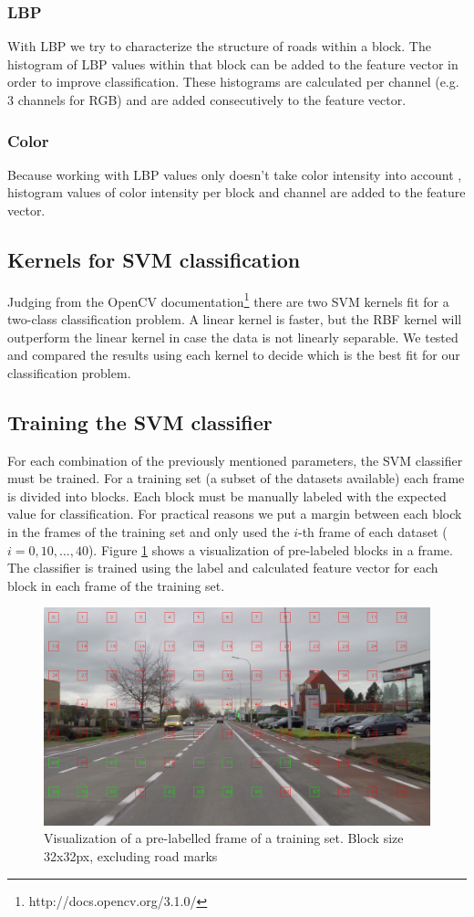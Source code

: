 \documentclass[runningheads,a4paper]{llncs}
\begin{document}
\subsubsection{LBP}
With LBP we try to characterize the structure of roads within a block. The histogram of LBP values within that block can be added to the feature vector in order to improve classification. These histograms are calculated per channel (e.g. 3 channels for RGB) and are added consecutively to the feature vector. 


\subsubsection{Color}
Because working with LBP values only doesn't take color intensity into account \cite{Pietikainen2002}, histogram values of color intensity per block and channel are added to the feature vector. 

\subsection{Kernels for SVM classification}\label{methods-kernels}
Judging from the OpenCV documentation\footnote{http://docs.opencv.org/3.1.0/} there are two SVM kernels fit for a two-class classification problem.
A linear kernel is faster, but the RBF kernel will outperform the linear kernel in case the data is not linearly separable. We tested and compared the results using each kernel to decide which is the best fit for our classification problem.

\subsection{Training the SVM classifier}
For each combination of the previously mentioned parameters, the SVM classifier must be trained. For a training set (a subset of the datasets available) each frame is divided into blocks. Each block must be manually labeled with the expected value for classification. For practical reasons we put a margin between each block in the frames of the training set and only used the $i$-th frame of each dataset ($i=0,10,...,40$).
Figure \ref{fig:frame-training} shows a visualization of pre-labeled blocks in a frame.
The classifier is trained using the label and calculated feature vector for each block in each frame of the training set.

\begin{figure}[ht]
\centering
  \centering
  \includegraphics[width=.7\textwidth]{fig/svm_training_32.png}
\caption{Visualization of a pre-labelled frame of a training set. Block size 32x32px, excluding road marks}
\label{fig:frame-training}
\end{figure}
\end{document}
